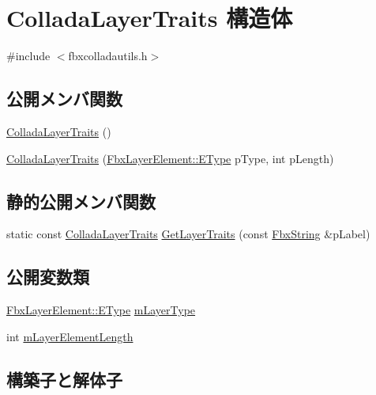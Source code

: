 \hypertarget{struct_collada_layer_traits}{}\section{Collada\+Layer\+Traits 構造体}
\label{struct_collada_layer_traits}


{\ttfamily \#include $<$fbxcolladautils.\+h$>$}

\subsection*{公開メンバ関数}
\begin{DoxyCompactItemize}
\item 
\hyperlink{struct_collada_layer_traits_a53f06a4cc0a322c53a835f89bca19caf}{Collada\+Layer\+Traits} ()
\item 
\hyperlink{struct_collada_layer_traits_a823980f2de7a3b074c41add0b972fb78}{Collada\+Layer\+Traits} (\hyperlink{class_fbx_layer_element_a8c95c5cd880b56c776acd379bd86f42c}{Fbx\+Layer\+Element\+::\+E\+Type} p\+Type, int p\+Length)
\end{DoxyCompactItemize}
\subsection*{静的公開メンバ関数}
\begin{DoxyCompactItemize}
\item 
static const \hyperlink{struct_collada_layer_traits}{Collada\+Layer\+Traits} \hyperlink{struct_collada_layer_traits_ab540128a228dc27186beca5c5dd5f707}{Get\+Layer\+Traits} (const \hyperlink{class_fbx_string}{Fbx\+String} \&p\+Label)
\end{DoxyCompactItemize}
\subsection*{公開変数類}
\begin{DoxyCompactItemize}
\item 
\hyperlink{class_fbx_layer_element_a8c95c5cd880b56c776acd379bd86f42c}{Fbx\+Layer\+Element\+::\+E\+Type} \hyperlink{struct_collada_layer_traits_a3e6c41211a794e53cfc029a7c7093784}{m\+Layer\+Type}
\item 
int \hyperlink{struct_collada_layer_traits_a101229f9fd16ad7c7e751ad716008704}{m\+Layer\+Element\+Length}
\end{DoxyCompactItemize}


\subsection{構築子と解体子}
\mbox{\label{struct_collada_layer_traits_a53f06a4cc0a322c53a835f89bca19caf}} 
